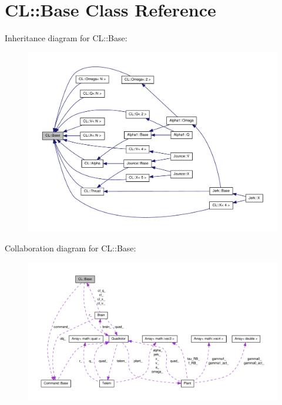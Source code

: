 \hypertarget{classCL_1_1Base}{\section{\-C\-L\-:\-:\-Base \-Class \-Reference}
\label{classCL_1_1Base}
}


\-Inheritance diagram for \-C\-L\-:\-:\-Base\-:\nopagebreak
\begin{figure}[H]
\begin{center}
\leavevmode
\includegraphics[width=350pt]{classCL_1_1Base__inherit__graph}
\end{center}
\end{figure}


\-Collaboration diagram for \-C\-L\-:\-:\-Base\-:\nopagebreak
\begin{figure}[H]
\begin{center}
\leavevmode
\includegraphics[width=350pt]{classCL_1_1Base__coll__graph}
\end{center}
\end{figure}
